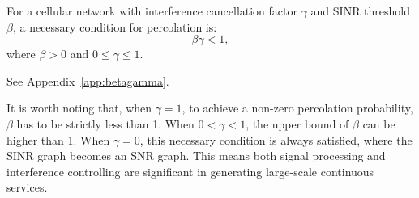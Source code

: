 \documentclass[final]{IEEEtran}
\begin{document}
\begin{theorem}
\label{theo:betagamma}
    For a cellular network with interference cancellation factor $\gamma$ and SINR threshold $\beta$, a necessary condition for percolation is:
\begin{equation}
    \beta\gamma<1,
\label{betagamma1}
\end{equation}
where $\beta>0$ and $0\leq \gamma\leq 1$.
\end{theorem}
\begin{IEEEproof}
    See Appendix~\ref{app:betagamma}.
\end{IEEEproof}
\begin{remark}
    It is worth noting that, when $\gamma=1$, to achieve a non-zero percolation probability, $\beta$ has to be strictly less than 1. When $0<\gamma<1$, the upper bound of $\beta$ can be higher than 1. When $\gamma=0$, this necessary condition is always satisfied, where the SINR graph becomes an SNR graph. This means both signal processing and interference controlling are significant in generating large-scale continuous services.
\end{remark}
\end{document}
